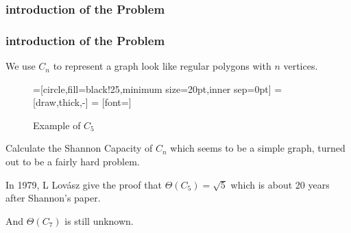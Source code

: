 \subsubsection*{introduction of the Problem}

\begin{frame}
      \frametitle{introduction of the Problem}
      
      We use $C_{n}$ to represent a graph look like regular polygons with $n$ vertices.

      \begin{figure}[h!]
            =[circle,fill=black!25,minimum size=20pt,inner sep=0pt]
             = [draw,thick,-]
             = [font=\small]
            \label{fig:PentagonExample}
            \caption{Example of $C_{5}$}
      \end{figure}

      \pause

      Calculate the Shannon Capacity of $C_{n}$ which seems to be a simple graph, turned out to be a fairly hard problem.
      
      In 1979, L Lovász give the proof that $\Theta(C_{5}) = \sqrt{5}$ which is about 20 years after Shannon's paper.

      And $\Theta(C_{7})$ is still unknown.

\end{frame}